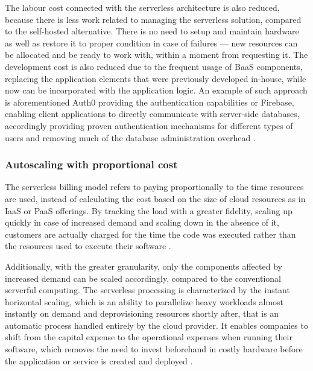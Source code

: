 The labour cost connected with the serverless architecture is also reduced, because there is less work related to managing the serverless solution, compared to the self-hosted alternative. There is no need to setup and maintain hardware as well as restore it to proper condition in case of failures --- new resources can be allocated and be ready to work with, within a moment from requesting it. The development cost is also reduced due to the frequent usage of BaaS components, replacing the application elements that were previously developed in-house, while now can be incorporated with the application logic. An example of such approach is aforementioned Auth0 providing the authentication capabilities or Firebase, enabling client applications to directly communicate with server-side databases, accordingly providing proven authentication mechanisms for different types of users and removing much of the database administration overhead \cite{MartinFowlerServerless}.

\subsubsection*{Autoscaling with proportional cost}

The serverless billing model refers to paying proportionally to the time resources are used, instead of calculating the cost based on the size of cloud resources as in IaaS or PaaS offerings. By tracking the load with a greater fidelity, scaling up quickly in case of increased demand and scaling down in the absence of it, customers are actually charged for the time the code was executed rather than the resources used to execute their software \cite{BerkeleyServerless}.

Additionally, with the greater granularity, only the components affected by increased demand can be scaled accordingly, compared to the conventional serverful computing. The serverless processing is characterized by the instant horizontal scaling, which is an ability to parallelize heavy workloads almost instantly on demand and deprovisioning resources shortly after, that is an automatic process handled entirely by the cloud provider. It enables companies to shift from the capital expense to the operational expenses when running their software, which removes the need to invest beforehand in costly hardware before the application or service is created and deployed \cite{LeveragingServerlessCloudComputingArchitectures}.


